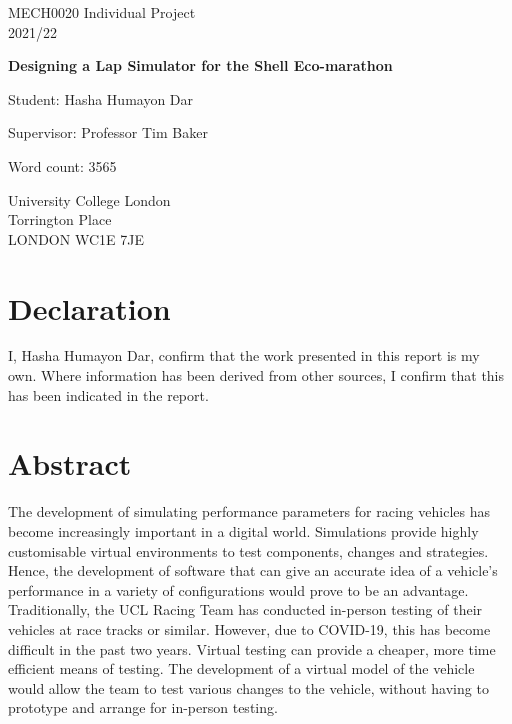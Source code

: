 \documentclass[11pt]{article}
\numberwithin{equation}{section}
\begin{document}
\begin{titlepage}
    \begin{center}
        \vspace*{1cm}
             
        MECH0020 Individual Project\\
        2021/22
 
        \vspace{1.5cm}

        {\LARGE \textbf{Designing a Lap Simulator for the Shell Eco-marathon} \par}
             
        \vspace{1.5cm}
 
        Student: Hasha Humayon Dar
        
        \vspace{0.25cm}

        Supervisor: Professor Tim Baker
        
        \vfill

        Word count: 3565

        \vspace{0.25cm}

        University College London\\
        Torrington Place\\
        LONDON WC1E 7JE
             
    \end{center}
 \end{titlepage}
\newpage
\section*{Declaration}
I, Hasha Humayon Dar, confirm that the work presented in this report is my own. Where information has been derived from other sources, I confirm that this has been indicated in the report.
\section*{Abstract}
The development of simulating performance parameters for racing vehicles has become increasingly important in a digital world. Simulations provide highly customisable virtual environments to test components, changes and strategies. Hence, the development of software that can give an accurate idea of a vehicle's performance in a variety of configurations would prove to be an advantage. Traditionally, the UCL Racing Team has conducted in-person testing of their vehicles at race tracks or similar. However, due to COVID-19, this has become difficult in the past two years. Virtual testing can provide a cheaper, more time efficient means of testing. The development of a virtual model of the vehicle would allow the team to test various changes to the vehicle, without having to prototype and arrange for in-person testing. 
\end{document}
